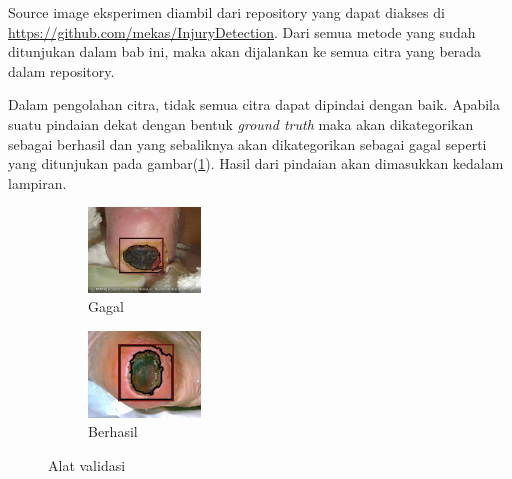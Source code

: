 Source image eksperimen diambil dari repository yang dapat diakses di
\href{https://github.com/mekas/InjuryDetection}{https://github.com/mekas/InjuryDetection}. 
Dari semua metode yang sudah ditunjukan 
dalam bab ini, maka akan dijalankan ke semua citra yang 
berada dalam repository. 

Dalam pengolahan citra, tidak semua citra dapat dipindai 
dengan baik. Apabila suatu pindaian dekat dengan bentuk 
\textit{ground truth} maka akan dikategorikan sebagai 
berhasil dan yang sebaliknya akan dikategorikan sebagai 
gagal seperti yang ditunjukan pada gambar(\ref{suksesgagal}). 
Hasil dari pindaian akan dimasukkan kedalam lampiran.
\begin{figure}[H]
	\centering
	\begin{subfigure}{.3\textwidth}
		\centering
		\includegraphics[keepaspectratio, width=3cm]{gambar/Data/BorderFollowing/Hitam/6 - failed.jpg}
		\caption{Gagal}
	\end{subfigure}
	\begin{subfigure}{.4\textwidth}
		\centering
		\includegraphics[keepaspectratio, width=3cm]{gambar/Data/BorderFollowing/Hitam/7 - sukses.jpg}
		\caption{Berhasil}
	\end{subfigure} 
	\caption{Alat validasi}
	\label{suksesgagal}
\end{figure}

